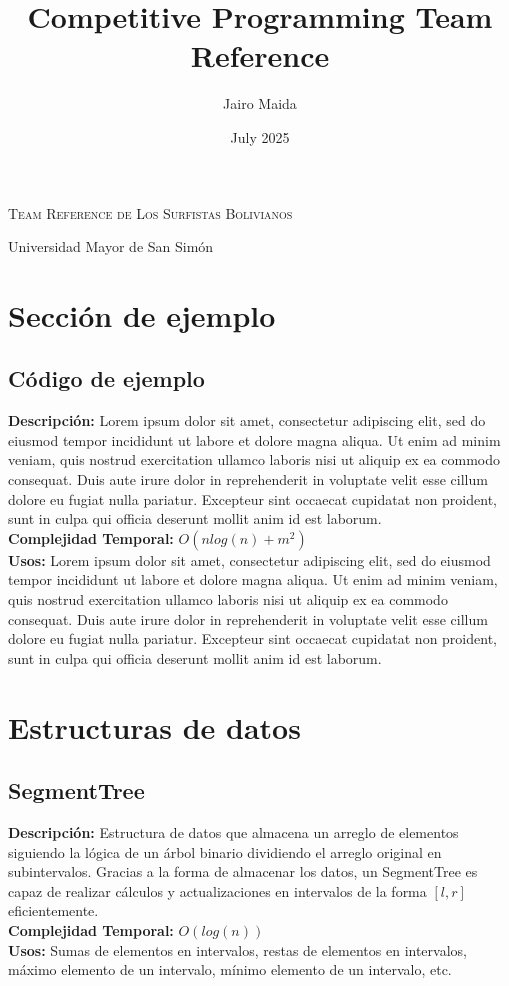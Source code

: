 \documentclass{article}
\title{Competitive Programming Team Reference}
\author{Jairo Maida}
\date{July 2025}
\newcommand{\includecpp}[6]{%
		\subsection{#1}
		\textbf{Descripción:} #2\\
		\textbf{Complejidad Temporal:} #3\\	
		\textbf{Usos: } #4	
		
}
\begin{document}
	\begin{center}
		\Huge\textsc{Team Reference de Los Surfistas Bolivianos}
		
		\vspace{0.35cm}
		
		\huge Universidad Mayor de San Simón
		
		\vspace{0.35cm}
		
	\end{center}

	
	\begin{multicols}{2}
		\tableofcontents
	\end{multicols}
	
	\pagebreak
	
	\section{Sección de ejemplo}
		\begin{multicols*}{2}
			\includecpp{Código de ejemplo}
			{Lorem ipsum dolor sit amet, consectetur adipiscing elit, sed do eiusmod tempor incididunt ut labore et dolore magna aliqua. Ut enim ad minim veniam, quis nostrud exercitation ullamco laboris nisi ut aliquip ex ea commodo consequat. Duis aute irure dolor in reprehenderit in voluptate velit esse cillum dolore eu fugiat nulla pariatur. Excepteur sint occaecat cupidatat non proident, sunt in culpa qui officia deserunt mollit anim id est laborum.}
			{$O(nlog(n) + m^{2})$}
			{Lorem ipsum dolor sit amet, consectetur adipiscing elit, sed do eiusmod tempor incididunt ut labore et dolore magna aliqua. Ut enim ad minim veniam, quis nostrud exercitation ullamco laboris nisi ut aliquip ex ea commodo consequat. Duis aute irure dolor in reprehenderit in voluptate velit esse cillum dolore eu fugiat nulla pariatur. Excepteur sint occaecat cupidatat non proident, sunt in culpa qui officia deserunt mollit anim id est laborum.}
			{.}
			{example_code.cpp}
			
		\end{multicols*}
	
	\pagebreak
	
	\section{Estructuras de datos}
	\begin{multicols*}{2}
		\includecpp{SegmentTree}
		{Estructura de datos que almacena un arreglo de elementos siguiendo la lógica de un árbol binario dividiendo el arreglo original en subintervalos. Gracias a la forma de almacenar los datos, un SegmentTree es capaz de realizar cálculos y actualizaciones en intervalos de la forma $[l, r]$ eficientemente.} 
		{$O(log(n))$}
		{Sumas de elementos en intervalos, restas de elementos en intervalos, máximo elemento de un intervalo, mínimo elemento de un intervalo, etc.}
		{Estructuras_Datos}
		{SegmentTree.cpp}
		
	\end{multicols*}
	
	
\end{document}
